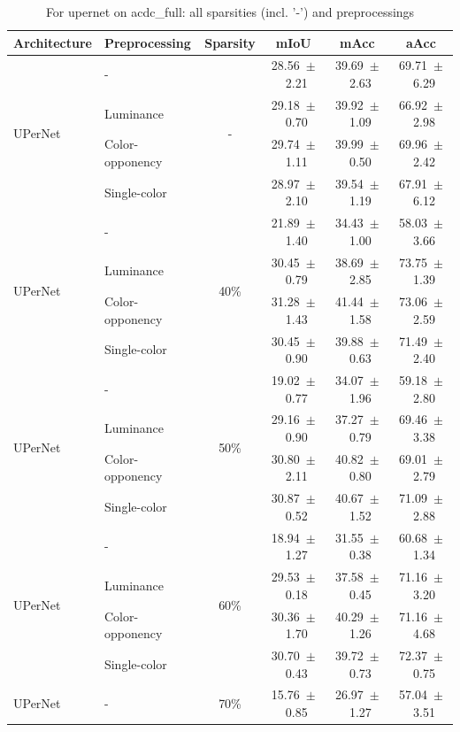 \begin{table}[h]
  \centering
  \caption{For upernet on acdc_full: all sparsities (incl. '-') and preprocessings}
  \begin{tabular}{@{}l l c c c c@{}}
    \toprule
    Architecture & Preprocessing & Sparsity & mIoU & mAcc & aAcc \\
    \midrule
    \multirow{4}{*}{UPerNet} & - & \multirow{4}{*}{-} & 28.56~$\pm$~2.21 & 39.69~$\pm$~2.63 & 69.71~$\pm$~6.29 \\
    & Luminance &  & 29.18~$\pm$~0.70 & 39.92~$\pm$~1.09 & 66.92~$\pm$~2.98 \\
    & Color-opponency &  & 29.74~$\pm$~1.11 & 39.99~$\pm$~0.50 & 69.96~$\pm$~2.42 \\
    & Single-color &  & 28.97~$\pm$~2.10 & 39.54~$\pm$~1.19 & 67.91~$\pm$~6.12 \\
    \midrule
    \multirow{4}{*}{UPerNet} & - & \multirow{4}{*}{40\%} & 21.89~$\pm$~1.40 & 34.43~$\pm$~1.00 & 58.03~$\pm$~3.66 \\
    & Luminance &  & 30.45~$\pm$~0.79 & 38.69~$\pm$~2.85 & 73.75~$\pm$~1.39 \\
    & Color-opponency &  & 31.28~$\pm$~1.43 & 41.44~$\pm$~1.58 & 73.06~$\pm$~2.59 \\
    & Single-color &  & 30.45~$\pm$~0.90 & 39.88~$\pm$~0.63 & 71.49~$\pm$~2.40 \\
    \midrule
    \multirow{4}{*}{UPerNet} & - & \multirow{4}{*}{50\%} & 19.02~$\pm$~0.77 & 34.07~$\pm$~1.96 & 59.18~$\pm$~2.80 \\
    & Luminance &  & 29.16~$\pm$~0.90 & 37.27~$\pm$~0.79 & 69.46~$\pm$~3.38 \\
    & Color-opponency &  & 30.80~$\pm$~2.11 & 40.82~$\pm$~0.80 & 69.01~$\pm$~2.79 \\
    & Single-color &  & 30.87~$\pm$~0.52 & 40.67~$\pm$~1.52 & 71.09~$\pm$~2.88 \\
    \midrule
    \multirow{4}{*}{UPerNet} & - & \multirow{4}{*}{60\%} & 18.94~$\pm$~1.27 & 31.55~$\pm$~0.38 & 60.68~$\pm$~1.34 \\
    & Luminance &  & 29.53~$\pm$~0.18 & 37.58~$\pm$~0.45 & 71.16~$\pm$~3.20 \\
    & Color-opponency &  & 30.36~$\pm$~1.70 & 40.29~$\pm$~1.26 & 71.16~$\pm$~4.68 \\
    & Single-color &  & 30.70~$\pm$~0.43 & 39.72~$\pm$~0.73 & 72.37~$\pm$~0.75 \\
    \midrule
    \multirow{4}{*}{UPerNet} & - & \multirow{4}{*}{70\%} & 15.76~$\pm$~0.85 & 26.97~$\pm$~1.27 & 57.04~$\pm$~3.51 \\

\end{tabular}
\end{table}
